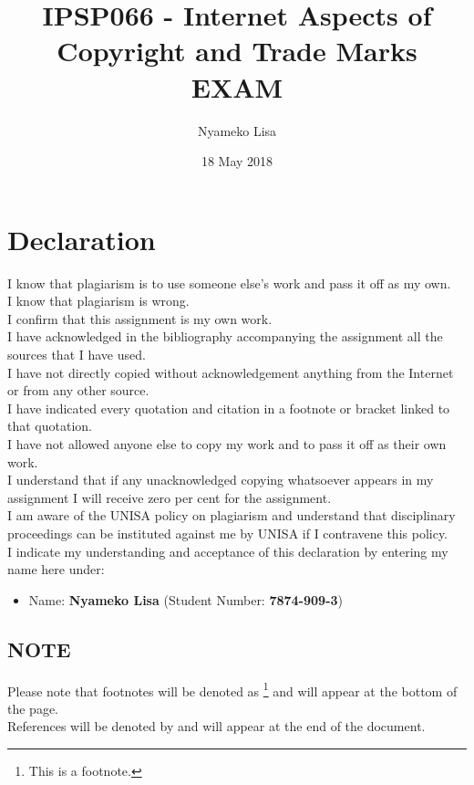 \documentclass[11pt]{article}
\author{Nyameko Lisa}
\date{18 May 2018}
\title{IPSP066 - Internet Aspects of Copyright and Trade Marks\\\medskip
\large EXAM}
\begin{document}
\maketitle
\addvspace{110pt}

\justifying
\addvspace{110pt}
\section*{Declaration}
\label{sec:org56f7dfe}
I know that plagiarism is to use someone else’s work and pass it off as my own.\\
I know that plagiarism is wrong.\\
I confirm that this assignment is my own work.\\
I have acknowledged in the bibliography accompanying the assignment all the sources that I have used.\\
I have not directly copied without acknowledgement anything from the Internet or from any other source.\\
I have indicated every quotation and citation in a footnote or bracket linked to that quotation.\\
I have not allowed anyone else to copy my work and to pass it off as their own work.\\
I understand that if any unacknowledged copying whatsoever appears in my assignment I will receive zero per cent for the assignment.\\
I am aware of the UNISA policy on plagiarism and understand that disciplinary proceedings can be instituted against me by UNISA if I contravene this policy.\\
I indicate my understanding and acceptance of this declaration by
entering my name here under:
\begin{itemize}
\item Name: \textbf{Nyameko Lisa} (Student Number: \textbf{7874-909-3})
\end{itemize}

\subsection*{NOTE}
\label{sec:org14d5f76}
Please note that footnotes will be denoted as \footnote{This is a footnote.} and will
appear at the bottom of the page.\\
References will be denoted by \cite{rsa93_tm_act} and will appear at the end of the document.
\newpage
\end{document}
